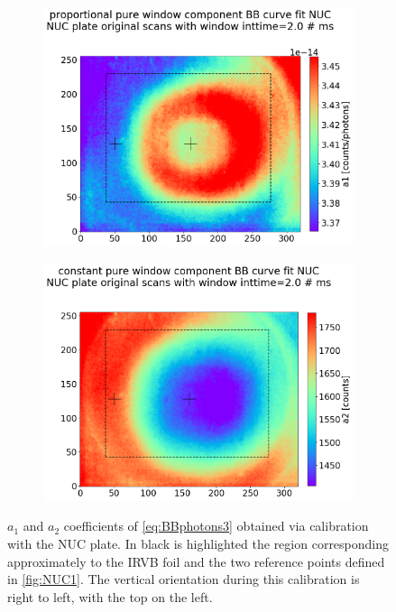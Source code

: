 \begin{figure}[!ht]
     \centering
     \begin{subfigure}{0.6\linewidth}
         \centering
	    \includegraphics[trim={40 0 0 60},clip,width=\linewidth]{Chapters/chapter2/figs/NUC_a12.png}
         \label{NUC_a1}
     \end{subfigure}
     \begin{subfigure}{0.6\linewidth}
         \centering
    	\includegraphics[trim={40 0 0 60},clip,width=\linewidth]{Chapters/chapter2/figs/NUC_a22.png}
         \label{NUC_a2}
     \end{subfigure}
    \caption{$a_1$ and $a_2$ coefficients of \autoref{eq:BBphotons3} obtained via calibration with the NUC plate. In black is highlighted the region corresponding approximately to the IRVB foil and the two reference points defined in \autoref{fig:NUC1}. The vertical orientation during this calibration is right to left, with the top on the left.}
    \label{fig:NUC_a1_a2}
\end{figure}


